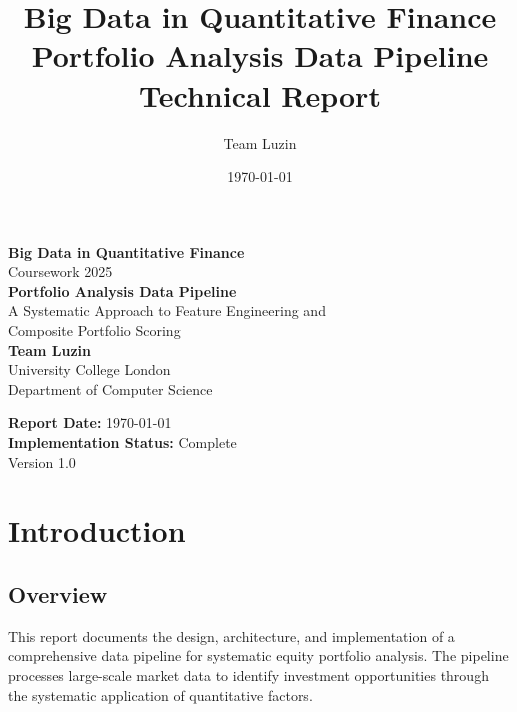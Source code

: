 \documentclass[11pt, a4paper, twoside]{article}
\title{\Large\textbf{Big Data in Quantitative Finance}\\[0.3cm]
       \Large Portfolio Analysis Data Pipeline\\[0.5cm]
       \normalsize Technical Report}
\author{Team Luzin}
\date{\today}
\begin{document}
\begin{titlepage}
    \centering
    \vspace*{2cm}
    
    {\Large\textbf{Big Data in Quantitative Finance}}\\[0.3cm]
    {\large Coursework 2025}\\[2cm]
    
    {\LARGE\textbf{Portfolio Analysis Data Pipeline}}\\[0.3cm]
    {\large A Systematic Approach to Feature Engineering and\\
    Composite Portfolio Scoring}\\[3cm]
    
    {\large\textbf{Team Luzin}}\\[0.5cm]
    {\normalsize University College London\\
    Department of Computer Science}\\[3cm]
    
    \vfill
    
    {\large\textbf{Report Date:} \today}\\[0.3cm]
    {\large\textbf{Implementation Status:} Complete}\\[2cm]
    
    {\small Version 1.0}
    
\end{titlepage}

\newpage
\tableofcontents
\newpage


\section{Introduction}
\label{sec:introduction}

\subsection{Overview}

This report documents the design, architecture, and implementation of a comprehensive data pipeline for systematic equity portfolio analysis. The pipeline processes large-scale market data to identify investment opportunities through the systematic application of quantitative factors.
\end{document}
